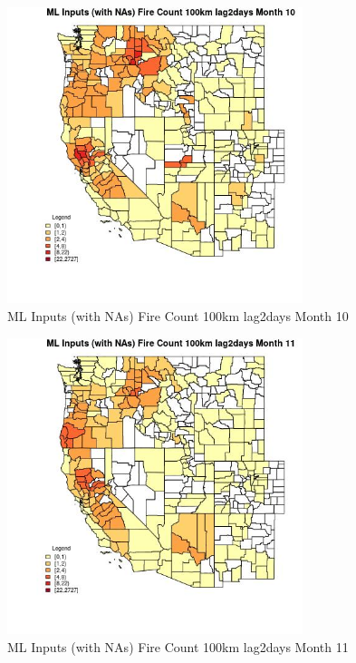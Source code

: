 \begin{figure} 
\centering  
\includegraphics[width=0.77\textwidth]{Code_Outputs/Report_ML_input_PM25_Step4_part_f_de_duplicated_aveswNAs_CountyFire_Count_100km_lag2daysmedianMonth10.jpg} 
\caption{\label{fig:Report_ML_input_PM25_Step4_part_f_de_duplicated_aveswNAsCountyFire_Count_100km_lag2daysmedianMonth10}ML Inputs (with NAs) Fire Count 100km lag2days Month 10} 
\end{figure} 
 

\clearpage 

\begin{figure} 
\centering  
\includegraphics[width=0.77\textwidth]{Code_Outputs/Report_ML_input_PM25_Step4_part_f_de_duplicated_aveswNAs_CountyFire_Count_100km_lag2daysmedianMonth11.jpg} 
\caption{\label{fig:Report_ML_input_PM25_Step4_part_f_de_duplicated_aveswNAsCountyFire_Count_100km_lag2daysmedianMonth11}ML Inputs (with NAs) Fire Count 100km lag2days Month 11} 
\end{figure} 
 

